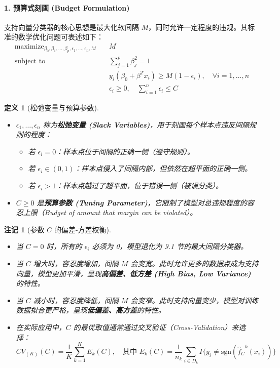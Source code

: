 \documentclass[UTF8]{ctexart}
\newtheorem{definition}[theorem]{定义}
\newtheorem{remark}{注记}[section]
\numberwithin{equation}{section}
\begin{document}
\paragraph{1. 预算式刻画 (Budget Formulation)}
支持向量分类器的核心思想是最大化软间隔 $M$，同时允许一定程度的违规。其标准的数学优化问题可表述如下：
\begin{align}
    \text{maximize}_{\beta_0, \beta_1, \dots, \beta_p, \epsilon_1, \dots, \epsilon_n, M} \quad & M \nonumber \\
    \text{subject to} \quad & \sum_{j=1}^p \beta_j^2 = 1 \label{eq:norm_constraint} \\
    & y_i(\beta_0 + \beta^T x_i) \ge M(1 - \epsilon_i), \quad \forall i=1,\dots,n \label{eq:margin_constraint} \\
    & \epsilon_i \ge 0, \quad \sum_{i=1}^n \epsilon_i \le C \label{eq:slack_constraint}
\end{align}

\begin{definition}[松弛变量与预算参数]
\begin{itemize}
    \item $\epsilon_1, \dots, \epsilon_n$ 称为\textbf{松弛变量 (Slack Variables)}，用于刻画每个样本点违反间隔规则的程度：
    \begin{itemize}
        \item 若 $\epsilon_i = 0$：样本点位于间隔的正确一侧（遵守规则）。
        \item 若 $\epsilon_i \in (0,1)$：样本点侵入了间隔内部，但依然在超平面的正确一侧。
        \item 若 $\epsilon_i > 1$：样本点越过了超平面，位于错误一侧（被误分类）。
    \end{itemize}
    \item $C \ge 0$ 是\textbf{预算参数 (Tuning Parameter)}，它限制了模型对总违规程度的容忍上限（Budget of amount that margin can be violated）。
\end{itemize}
\end{definition}

\begin{remark}[参数 $C$ 的偏差-方差权衡]
\begin{itemize}
    \item 当 $C=0$ 时，所有的 $\epsilon_i$ 必须为 0，模型退化为 9.1 节的最大间隔分类器。
    \item 当 $C$ 增大时，容忍度增加，间隔 $M$ 会变宽。此时允许更多的数据点成为支持向量，模型更加平滑，呈现\textbf{高偏差、低方差 (High Bias, Low Variance)} 的特性。
    \item 当 $C$ 减小时，容忍度降低，间隔 $M$ 会变窄。此时支持向量变少，模型对训练数据拟合更严格，呈现\textbf{低偏差、高方差}的特性。
    \item 在实际应用中，$C$ 的最优取值通常通过交叉验证（Cross-Validation）来选择：
    $$CV_{(K)}(C) = \frac{1}{K} \sum_{k=1}^K E_k(C), \quad \text{其中 } E_k(C) = \frac{1}{n_k} \sum_{i \in D_k} I\{y_i \neq \text{sgn}(\hat{f}_C^{-k}(x_i))\}$$
\end{itemize}
\end{remark}
\end{document}
